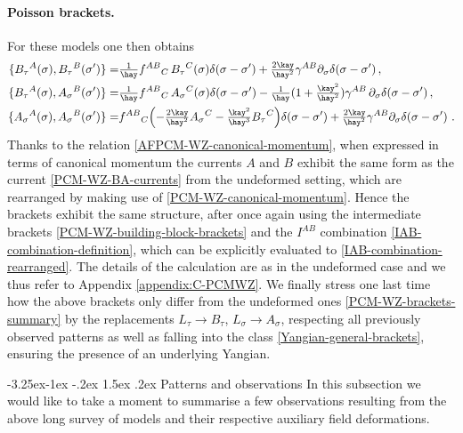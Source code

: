 \documentclass[12pt]{article}
\makeatletter
\renewcommand\subsection{\@startsection{subsection}{2}{\z@}%
                                     {-3.25ex\@plus -1ex \@minus -.2ex}%
                                     {1.5ex \@plus .2ex}%
                                     {\normalfont\bfseries}}
\numberwithin{equation}{section}
\makeatother
\begin{document}
\paragraph{Poisson brackets.}
For these models one then obtains
\begin{align}\label{AFPCM-WZ-brackets-summary}
\{ B_{\tau}{}^{A}(\sigma),B_{\tau}{}^{B}(\sigma') \} =& \tfrac{1}{\hay}f^{AB}{}_{C} \, B_{\tau}{}^{C}(\sigma)\delta(\sigma-\sigma')+\tfrac{2\kay}{\hay^2}\gamma^{AB}\partial_{\sigma}\delta(\sigma-\sigma') \, ,
\notag \\
\{ B_{\tau}{}^{A}(\sigma),A_{\sigma}{}^{B}(\sigma') \} =& \tfrac{1}{\hay}f^{AB}{}_{C} \, A_{\sigma}{}^{C}(\sigma)\delta(\sigma-\sigma')-\tfrac{1}{\hay}(1+\tfrac{\kay^2}{\hay^2})\gamma^{AB} \, \partial_{\sigma}\delta(\sigma-\sigma') \, ,
\\
\{ A_{\sigma}{}^{A}(\sigma),A_{\sigma}{}^{B}(\sigma') \} =& f^{AB}{}_{C}\Bigl(-\tfrac{2\kay}{\hay^2}A_{\sigma}{}^{C}-\tfrac{\kay^2}{\hay^3}B_{\tau}{}^{C}\Bigr)\delta(\sigma-\sigma')+\tfrac{2\kay}{\hay^2}\gamma^{AB}\partial_{\sigma}\delta(\sigma-\sigma') \,\, .
\notag
\end{align}
Thanks to the relation \eqref{AFPCM-WZ-canonical-momentum}, when expressed in terms of canonical momentum the currents $A$ and $B$ exhibit the same form as the current \eqref{PCM-WZ-BA-currents} from the undeformed setting, which are rearranged by making use of \eqref{PCM-WZ-canonical-momentum}. Hence the brackets exhibit the same structure, after once again using the intermediate brackets \eqref{PCM-WZ-building-block-brackets} and the $I^{AB}$ combination \eqref{IAB-combination-definition}, which can be explicitly evaluated to \eqref{IAB-combination-rearranged}. The details of the calculation are as in the undeformed case and we thus refer to Appendix \ref{appendix:C-PCMWZ}. We finally stress one last time how the above brackets only differ from the undeformed ones \eqref{PCM-WZ-brackets-summary} by the replacements $L_{\tau}\rightarrow B_{\tau}$, $L_{\sigma}\rightarrow A_{\sigma}$, respecting all previously observed patterns as well as falling into the class \eqref{Yangian-general-brackets}, ensuring the presence of an underlying Yangian.


\subsection{Patterns and observations}
In this subsection we would like to take a moment to summarise a few observations resulting from the above long survey of models and their respective auxiliary field deformations. 
\end{document}
